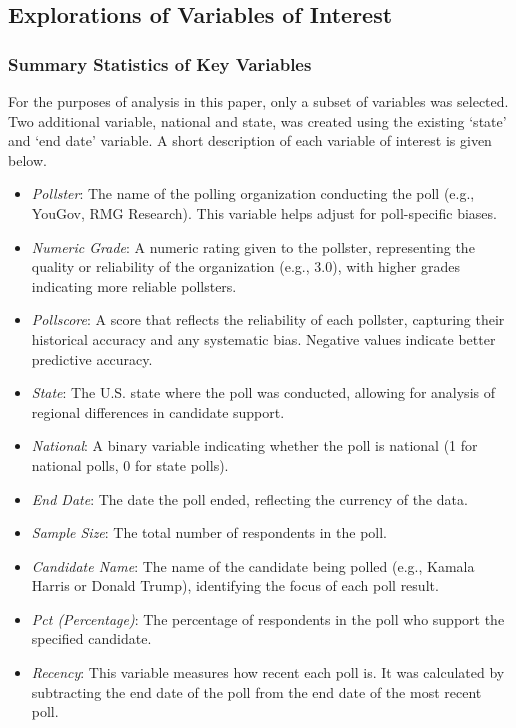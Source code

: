 \documentclass[
  letterpaper,
  DIV=11,
  numbers=noendperiod]{scrartcl}
\begin{document}
\hypertarget{explorations-of-variables-of-interest}{%
\subsection{Explorations of Variables of
Interest}\label{explorations-of-variables-of-interest}}

\hypertarget{summary-statistics-of-key-variables}{%
\subsubsection{Summary Statistics of Key
Variables}\label{summary-statistics-of-key-variables}}

\vspace{0.7cm}

For the purposes of analysis in this paper, only a subset of variables
was selected. Two additional variable, national and state, was created
using the existing `state' and `end date' variable. A short description
of each variable of interest is given below.

\begin{itemize}
\item
  \emph{Pollster}: The name of the polling organization conducting the
  poll (e.g., YouGov, RMG Research). This variable helps adjust for
  poll-specific biases.
\item
  \emph{Numeric Grade}: A numeric rating given to the pollster,
  representing the quality or reliability of the organization (e.g.,
  3.0), with higher grades indicating more reliable pollsters.
\item
  \emph{Pollscore}: A score that reflects the reliability of each
  pollster, capturing their historical accuracy and any systematic bias.
  Negative values indicate better predictive accuracy.
\item
  \emph{State}: The U.S. state where the poll was conducted, allowing
  for analysis of regional differences in candidate support.
\item
  \emph{National}: A binary variable indicating whether the poll is
  national (1 for national polls, 0 for state polls).
\item
  \emph{End Date}: The date the poll ended, reflecting the currency of
  the data.
\item
  \emph{Sample Size}: The total number of respondents in the poll.
\item
  \emph{Candidate Name}: The name of the candidate being polled (e.g.,
  Kamala Harris or Donald Trump), identifying the focus of each poll
  result.
\item
  \emph{Pct (Percentage)}: The percentage of respondents in the poll who
  support the specified candidate.
\item
  \emph{Recency}: This variable measures how recent each poll is. It was
  calculated by subtracting the end date of the poll from the end date
  of the most recent poll.
\end{itemize}
\end{document}
